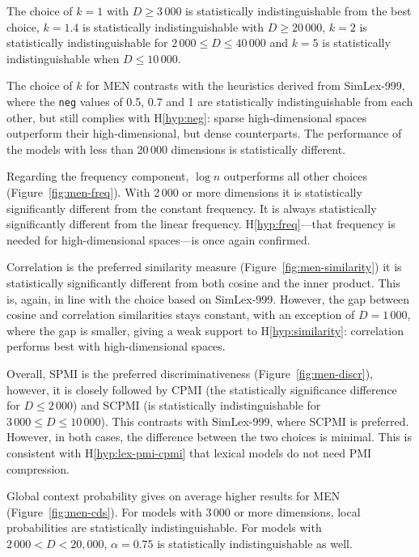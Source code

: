 The choice of $k = 1$ with $D \ge 3\,000$ is statistically indistinguishable from the best choice, $k = 1.4$ is statistically indistinguishable with $D \ge 20\,000$, $k = 2$ is statistically indistinguishable for $2\,000 \le D \le 40\,000$ and $k = 5$ is statistically indistinguishable when $D \le 10\,000$.

The choice of $k$ for MEN contrasts with the heuristics derived from SimLex-999, where the \texttt{neg} values of 0.5, 0.7 and 1 are statistically indistinguishable from each other, but still complies with H\ref{hyp:neg}: sparse high-dimensional spaces outperform their high-dimensional, but dense counterparts. The performance of the models with less than 20\,000 dimensions is statistically different.

Regarding the frequency component, $\log n$ outperforms all other choices (Figure~\ref{fig:men-freq}). With 2\,000 or more dimensions it is statistically significantly different from the constant frequency. It is always statistically significantly different from the linear frequency. H\ref{hyp:freq}---that frequency is needed for high-dimensional spaces---is once again confirmed.



Correlation is the preferred similarity measure (Figure~\ref{fig:men-similarity}) it is statistically significantly different from both cosine and the inner product. This is, again, in line with the choice based on SimLex-999. However, the gap between cosine and correlation similarities stays constant, with an exception of $D = 1\,000$, where the gap is smaller, giving a weak support to H\ref{hyp:similarity}: correlation performs best with high-dimensional spaces.



Overall, SPMI is the preferred discriminativeness (Figure~\ref{fig:men-discr}), however, it is closely followed by CPMI (the statistically significance difference for $D \le 2\,000$) and SCPMI (is statistically indistinguishable for $3\,000 \le D \le 10\,000$). This contrasts with SimLex-999, where SCPMI is preferred. However, in both cases, the difference between the two choices is minimal. This is consistent with H\ref{hyp:lex-pmi-cpmi} that lexical models do not need PMI compression.

Global context probability gives on average higher results for MEN (Figure~\ref{fig:men-cds}). For models with 3\,000 or more dimensions, local probabilities are statistically indistinguishable. For models with $2\,000< D < 20,000$, $\alpha = 0.75$ is statistically indistinguishable as well.

